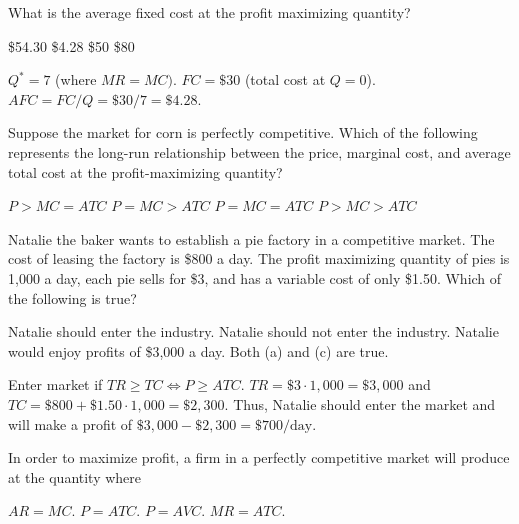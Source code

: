 \documentclass[addpoints,11pt]{exam}
\theoremstyle{definition}
\begin{document}
\begin{questions}
			\question \label{blah2} What is the average fixed cost at the profit maximizing quantity?
			
			\begin{choices}
				\choice \$54.30
				\CorrectChoice \$4.28
				\choice \$50
				\choice \$80
			\end{choices}
			
			\begin{solution}
				$Q^* = 7$ (where $MR = MC).$ $FC = \$30$ (total cost at $Q=0$). $AFC = FC/Q = \$30/7 = \$4.28$.
			\end{solution}
			
	\question Suppose the market for corn is perfectly competitive. Which of the following represents the long-run relationship between the price, marginal cost, and average total cost at the profit-maximizing quantity?
	
	\begin{choices}
		\choice $P > MC = ATC$
		\choice $P = MC > ATC$ 
		\CorrectChoice $P = MC = ATC$
		\choice $P > MC > ATC$
	\end{choices}
			
			
			\question Natalie the baker wants to establish a pie factory in a competitive market. The cost of leasing the factory is \$800 a day. The profit maximizing quantity of pies is 1,000 a day, each pie sells for \$3, and has a variable cost of only \$1.50. Which of the following is true?
			
			\begin{choices}
				\CorrectChoice Natalie should enter the industry.
				\choice Natalie should not enter the industry.
				\choice Natalie would enjoy profits of \$3,000 a day.
				\choice Both (a) and (c) are true.
			\end{choices}
			
			\begin{solution}
				Enter market if $TR \ge TC \iff P \ge ATC$. $TR = \$3\cdot 1,000 = \$3,000$ and $TC = \$800 + \$1.50\cdot 1,000 = \$2,300$. Thus, Natalie should enter the market and will make a profit of $\$3,000 - \$2,300 = \$700/\text{day}.$
			\end{solution}
			
			\question In order to maximize profit, a firm in a perfectly competitive market will produce at the quantity where
			
			\begin{choices}
				\CorrectChoice $AR = MC$.
				\choice $P = ATC$.
				\choice $P = AVC$.
				\choice $MR = ATC$.
			\end{choices}


\end{questions}
\end{document}

